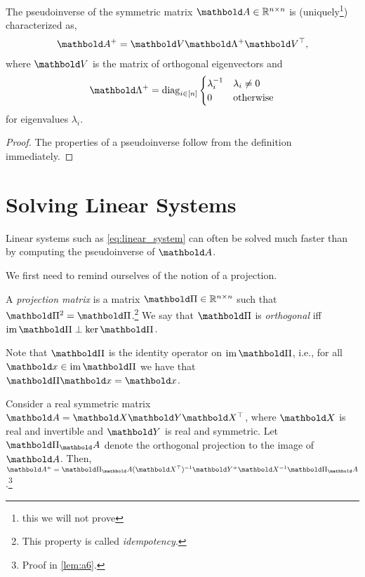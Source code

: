 \begin{lem}
The pseudoinverse of the symmetric matrix $\mA \in \R^{n \times n}$ is (uniquely\footnote{this we will not prove}) characterized as, \begin{align}
    \pinv{\mA} = \mV\pinv{\mLambda}\trans{\mV},
\end{align} where $\mV$ is the matrix of orthogonal eigenvectors and \begin{align}
    \pinv{\mLambda} = \diag_{i\in[n]}\begin{cases}
    \inv{\lambda_i} & \lambda_i \neq 0 \\
    0 & \text{otherwise}
    \end{cases}
\end{align} for eigenvalues $\lambda_i$.
\end{lem}
\begin{proof}
The properties of a pseudoinverse follow from the definition immediately.
\end{proof}

\section{Solving Linear Systems}

Linear systems such as \cref{eq:linear_system} can often be solved much faster than by computing the pseudoinverse of $\mA$.

We first need to remind ourselves of the notion of a projection.

\begin{defn} A \emph{projection matrix} is a matrix $\mPi \in \R^{n \times n}$ such that $\mPi^2 = \mPi$.\footnote{This property is called \emph{idempotency}.} We say that $\mPi$ is \emph{orthogonal} iff $\im\mPi \perp \ker\mPi$.
\end{defn}
\begin{rmk}
Note that $\mPi$ is the identity operator on $\im\mPi$, i.e., for all $\vx \in \im\mPi$ we have that $\mPi\vx = \vx$.
\end{rmk}

\begin{lem} Consider a real symmetric matrix $\mA = \mX\mY\trans{\mX}$, where $\mX$ is real and invertible and $\mY$ is real and symmetric. Let $\mPi_\mA$ denote the orthogonal projection to the image of $\mA$. Then, $\pinv{\mA} = \mPi_\mA\inv{(\trans{\mX})}\pinv{\mY}\inv{\mX}\mPi_\mA$.\footnote{Proof in \cref{lem:a6}.}
\end{lem}

